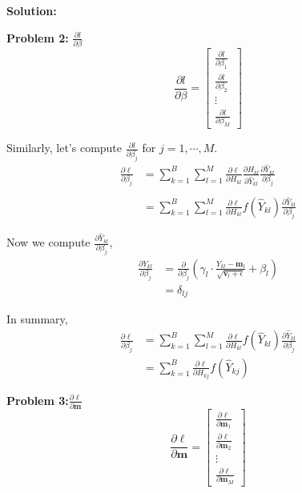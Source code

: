 \documentclass{article}
\newenvironment{solution}
  {\par\noindent\textbf{Solution:}\par}
  {\par}
\begin{document}
\begin{solution}
  \textbf{Problem 2:} $\frac{\partial l}{\partial \beta}$
  $$ \frac{\partial l}{\partial \beta} = \begin{bmatrix}  \frac{\partial l}{\partial \beta_1} \\  \frac{\partial l}{\partial \beta_2} \\ \vdots \\ \frac{\partial l}{\partial \beta_M}  \end{bmatrix} $$

  Similarly, let's compute $ \frac{\partial l}{\partial \beta_j}$ for $j = 1,\cdots, M$. 
 \[ 
  \begin{aligned}
    \frac{\partial \ell}{\partial \beta_j} &= \sum_{k = 1}^{B} \sum_{l = 1}^{M} \frac{\partial \ell}{\partial H_{kl}}\frac{\partial H_{kl}}{\partial \hat{Y}_{kl}}\frac{\partial \hat{Y}_{kl}}{\partial \beta_j}  \\
                                         \\ &=\sum_{k = 1}^{B} \sum_{l = 1}^{M} \frac{\partial \ell}{\partial H_{kl}}f(\hat{Y}_{kl})\frac{\partial \hat{Y}_{kl}}{\partial \beta_j}
  \end{aligned}
  \]

  Now we compute $\frac{\partial \hat{Y}_{kl}}{\partial \beta_j}$,
  \[
    \begin{aligned}
      \frac{\partial \hat{Y}_{kl}}{\partial \beta_j} &= \frac{\partial}{\partial \beta_j}  \left( \gamma_l \cdot \frac{ Y_{kl} - \textbf{m}_l }{\sqrt{\textbf{v}_l + \epsilon}} + \beta_l \right) \\  
                        &= \delta_{lj}
    \end{aligned}
  \]

  In summary,
  \[
      \begin{aligned}
      \frac{\partial \ell}{\partial \beta_j} &=\sum_{k = 1}^{B} \sum_{l = 1}^{M} \frac{\partial \ell}{\partial H_{kl}}f(\hat{Y}_{kl})\frac{\partial \hat{Y}_{kl}}{\partial \beta_j} \\ 
                                             &=\sum_{k=1}^B \frac{\partial \ell}{\partial H_{kj}} f(\hat{Y}_{kj})
      \end{aligned}
  \]

  \textbf{Problem 3:}$\frac{\partial \ell}{\partial \textbf{m}}$
  $$\frac{\partial \ell}{\partial \textbf{m}} = \begin{bmatrix} \frac{\partial \ell}{\partial \textbf{m}_1} \\ \frac{\partial \ell}{\partial \textbf{m}_2}  \\ \vdots \\ \frac{\partial \ell}{\partial \textbf{m}_M}  \end{bmatrix}$$


\end{solution}
\end{document}

